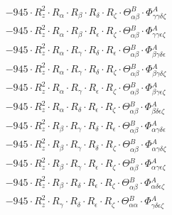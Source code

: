\documentclass{article}
\begin{document}
\begin{subequations}
\begin{gather}
\begin{array}{c}
 \\[0.2em] 		 - 945 \cdot R_{z}^{2} \cdot R_{\alpha{}} \cdot R_{\beta{}} \cdot R_{\delta{}} \cdot R_{\zeta{}} \cdot \Theta{}^{B}_{\alpha{}\beta{}} \cdot \Phi{}^{A}_{\gamma{}\gamma{}\delta{}\zeta{}} 
 \\[0.2em] 		 - 945 \cdot R_{z}^{2} \cdot R_{\alpha{}} \cdot R_{\beta{}} \cdot R_{\epsilon{}} \cdot R_{\zeta{}} \cdot \Theta{}^{B}_{\alpha{}\beta{}} \cdot \Phi{}^{A}_{\gamma{}\gamma{}\epsilon{}\zeta{}} 
 \\[0.2em] 		 - 945 \cdot R_{z}^{2} \cdot R_{\alpha{}} \cdot R_{\gamma{}} \cdot R_{\delta{}} \cdot R_{\epsilon{}} \cdot \Theta{}^{B}_{\alpha{}\beta{}} \cdot \Phi{}^{A}_{\beta{}\gamma{}\delta{}\epsilon{}} 
 \\[0.2em] 		 - 945 \cdot R_{z}^{2} \cdot R_{\alpha{}} \cdot R_{\gamma{}} \cdot R_{\delta{}} \cdot R_{\zeta{}} \cdot \Theta{}^{B}_{\alpha{}\beta{}} \cdot \Phi{}^{A}_{\beta{}\gamma{}\delta{}\zeta{}} 
 \\[0.2em] 		 - 945 \cdot R_{z}^{2} \cdot R_{\alpha{}} \cdot R_{\gamma{}} \cdot R_{\epsilon{}} \cdot R_{\zeta{}} \cdot \Theta{}^{B}_{\alpha{}\beta{}} \cdot \Phi{}^{A}_{\beta{}\gamma{}\epsilon{}\zeta{}} 
 \\[0.2em] 		 - 945 \cdot R_{z}^{2} \cdot R_{\alpha{}} \cdot R_{\delta{}} \cdot R_{\epsilon{}} \cdot R_{\zeta{}} \cdot \Theta{}^{B}_{\alpha{}\beta{}} \cdot \Phi{}^{A}_{\beta{}\delta{}\epsilon{}\zeta{}} 
 \\[0.2em] 		 - 945 \cdot R_{z}^{2} \cdot R_{\beta{}} \cdot R_{\gamma{}} \cdot R_{\delta{}} \cdot R_{\epsilon{}} \cdot \Theta{}^{B}_{\alpha{}\beta{}} \cdot \Phi{}^{A}_{\alpha{}\gamma{}\delta{}\epsilon{}} 
 \\[0.2em] 		 - 945 \cdot R_{z}^{2} \cdot R_{\beta{}} \cdot R_{\gamma{}} \cdot R_{\delta{}} \cdot R_{\zeta{}} \cdot \Theta{}^{B}_{\alpha{}\beta{}} \cdot \Phi{}^{A}_{\alpha{}\gamma{}\delta{}\zeta{}} 
 \\[0.2em] 		 - 945 \cdot R_{z}^{2} \cdot R_{\beta{}} \cdot R_{\gamma{}} \cdot R_{\epsilon{}} \cdot R_{\zeta{}} \cdot \Theta{}^{B}_{\alpha{}\beta{}} \cdot \Phi{}^{A}_{\alpha{}\gamma{}\epsilon{}\zeta{}} 
 \\[0.2em] 		 - 945 \cdot R_{z}^{2} \cdot R_{\beta{}} \cdot R_{\delta{}} \cdot R_{\epsilon{}} \cdot R_{\zeta{}} \cdot \Theta{}^{B}_{\alpha{}\beta{}} \cdot \Phi{}^{A}_{\alpha{}\delta{}\epsilon{}\zeta{}} 
 \\[0.2em] 		 - 945 \cdot R_{z}^{2} \cdot R_{\gamma{}} \cdot R_{\delta{}} \cdot R_{\epsilon{}} \cdot R_{\zeta{}} \cdot \Theta{}^{B}_{\alpha{}\alpha{}} \cdot \Phi{}^{A}_{\gamma{}\delta{}\epsilon{}\zeta{}} 

\end{array}
\end{gather}
\end{subequations}
\end{document}
